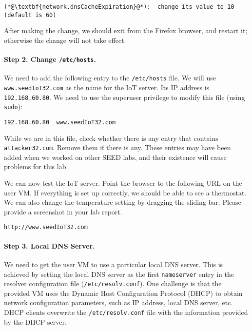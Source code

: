 \begin{lstlisting}
(*@\textbf{network.dnsCacheExpiration}@*):  change its value to 10 (default is 60)
\end{lstlisting}

After making the change, we should exit from the Firefox browser, and restart it; otherwise the
change will not take effect.


\paragraph{Step 2. Change \texttt{/etc/hosts}.}
We need to add the following entry to the \texttt{/etc/hosts} file. 
We will use \texttt{www.seedIoT32.com} as the name for the 
IoT server. Its IP address is \texttt{192.168.60.80}. 
We need to use the superuser privilege to modify this file (using \texttt{sudo}): 

\begin{lstlisting}
192.168.60.80  www.seedIoT32.com
\end{lstlisting}

While we are in this file, check whether there is any entry 
that contains \texttt{attacker32.com}. Remove them if there 
is any. These entries may have been added when we worked on
other SEED labs, and their existence will cause problems for this lab. 


We can now test the IoT server. Point the browser to the following URL on the 
user VM. If everything is set up correctly, we should be able to see 
a thermostat. We can also change the temperature setting by dragging the 
sliding bar. Please provide a screenshot in your lab report. 

\begin{lstlisting}
http://www.seedIoT32.com
\end{lstlisting}
 


\paragraph{Step 3. Local DNS Server.}
We need to get the user VM to use a particular local DNS server. This is achieved by
setting the local DNS server as the first \texttt{nameserver} entry in the resolver
configuration file (\texttt{/etc/resolv.conf}). 
One challenge is that the provided VM uses the
Dynamic Host Configuration Protocol (DHCP) to obtain network configuration parameters, such as
IP address, local DNS server, etc. DHCP clients overwrite the \texttt{/etc/resolv.conf}
file with the information provided by the DHCP server.

